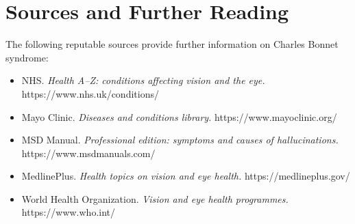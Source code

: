 \section*{Sources and Further Reading}
The following reputable sources provide further information on Charles Bonnet syndrome:
\begin{itemize}
    \item NHS. \textit{Health A--Z: conditions affecting vision and the eye.} https://www.nhs.uk/conditions/
    \item Mayo Clinic. \textit{Diseases and conditions library.} https://www.mayoclinic.org/
    \item MSD Manual. \textit{Professional edition: symptoms and causes of hallucinations.} https://www.msdmanuals.com/
    \item MedlinePlus. \textit{Health topics on vision and eye health.} https://medlineplus.gov/
    \item World Health Organization. \textit{Vision and eye health programmes.} https://www.who.int/
\end{itemize}
